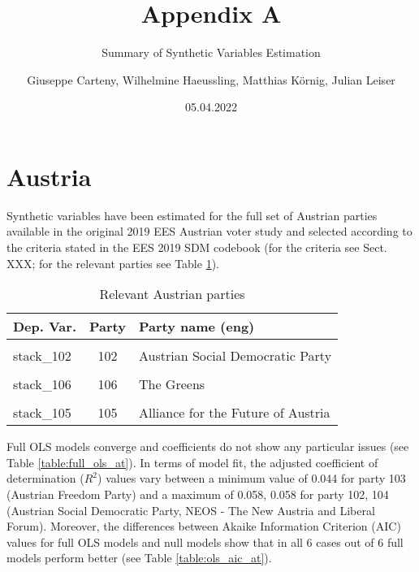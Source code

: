 \documentclass[
]{article}
\title{Appendix A}
\subtitle{Summary of Synthetic Variables Estimation}
\author{Giuseppe Carteny, Wilhelmine Haeussling, Matthias Körnig, Julian Leiser}
\date{05.04.2022}
\begin{document}
\maketitle

\newpage

\hypertarget{austria}{%
\section{Austria}\label{austria}}

Synthetic variables have been estimated for the full set of Austrian parties available in the original
2019 EES Austrian voter study and selected according to the criteria stated in the EES 2019 SDM codebook (for the criteria see Sect. XXX; for the relevant parties see Table \ref{table:relprty_tab_at}).

\begin{table}[!h]

\caption{\label{tab:unnamed-chunk-3}Relevant Austrian parties \label{table:relprty_tab_at}}
\centering
\begin{tabular}[t]{lcl}
\toprule
Dep. Var. & Party & Party name (eng)\\
\midrule
\cellcolor{gray!6}{stack\_101} & \cellcolor{gray!6}{101} & \cellcolor{gray!6}{Austrian People's Party}\\
stack\_102 & 102 & Austrian Social Democratic Party\\
\cellcolor{gray!6}{stack\_104} & \cellcolor{gray!6}{104} & \cellcolor{gray!6}{NEOS - The New Austria and Liberal Forum}\\
stack\_106 & 106 & The Greens\\
\cellcolor{gray!6}{stack\_103} & \cellcolor{gray!6}{103} & \cellcolor{gray!6}{Austrian Freedom Party}\\
\addlinespace
stack\_105 & 105 & Alliance for the Future of Austria\\
\bottomrule
\end{tabular}
\end{table}

Full OLS models converge and coefficients do not show any particular issues (see Table
\ref{table:full_ols_at}).
In terms of model fit, the adjusted coefficient of determination (\(R^2\)) values vary between
a minimum value of 0.044
for party 103
(Austrian Freedom Party)
and a maximum of 0.058, 0.058
for party 102, 104
(Austrian Social Democratic Party, NEOS - The New Austria and Liberal Forum).
Moreover, the differences between Akaike Information Criterion (AIC) values for full OLS models and null
models show that in all 6 cases out of 6 full models perform better (see Table
\ref{table:ols_aic_at}).
\end{document}
